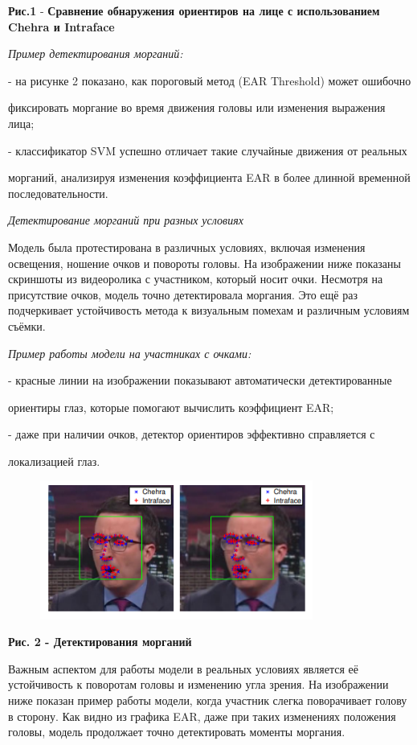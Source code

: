 {\bfseries Рис.1} - {\bfseries Сравнение обнаружения ориентиров на лице с
использованием Chehra и Intraface}

\emph{Пример детектирования морганий:}

- на рисунке 2 показано, как пороговый метод (EAR Threshold) может
ошибочно

фиксировать моргание во время движения головы или изменения выражения
лица;

- классификатор SVM успешно отличает такие случайные движения от
реальных

морганий, анализируя изменения коэффициента EAR в более длинной
временной последовательности.

\emph{Детектирование морганий при разных условиях}

Модель была протестирована в различных условиях, включая изменения
освещения, ношение очков и повороты головы. На изображении ниже показаны
скриншоты из видеоролика с участником, который носит очки. Несмотря на
присутствие очков, модель точно детектировала моргания. Это ещё раз
подчеркивает устойчивость метода к визуальным помехам и различным
условиям съёмки.

\emph{Пример работы модели на участниках с очками:}

- красные линии на изображении показывают автоматически детектированные

ориентиры глаз, которые помогают вычислить коэффициент EAR;

- даже при наличии очков, детектор ориентиров эффективно справляется с

локализацией глаз.

\begin{figure}[H]
	\centering
	\includegraphics[width=0.8\textwidth]{media/ict/image16}
	\caption*{}
\end{figure}


{\bfseries Рис. 2 - Детектирования морганий}

Важным аспектом для работы модели в реальных условиях является её
устойчивость к поворотам головы и изменению угла зрения. На изображении
ниже показан пример работы модели, когда участник слегка поворачивает
голову в сторону. Как видно из графика EAR, даже при таких изменениях
положения головы, модель продолжает точно детектировать моменты
моргания.

